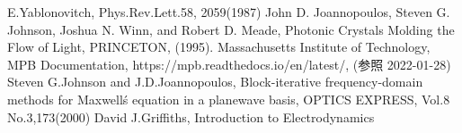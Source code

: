 \documentclass[a4paper,11pt,dvipdfmx]{jsreport}
\begin{document}
\tableofcontents







\begin{thebibliography}{2}
   E.Yablonovitch, Phys.Rev.Lett.58, 2059(1987)
   John D. Joannopoulos, Steven G. Johnson, Joshua N. Winn, and Robert D. Meade, Photonic Crystals Molding the Flow of Light, PRINCETON, (1995).
   Massachusetts Institute of Technology, MPB Documentation, https://mpb.readthedocs.io/en/latest/, (参照 2022-01-28)
   Steven G.Johnson and J.D.Joannopoulos, Block-iterative frequency-domain methods
  for Maxwell\'s equation in a planewave basis, OPTICS EXPRESS, Vol.8 No.3,173(2000)
   David J.Griffiths, Introduction to Electrodynamics
\end{thebibliography}
\end{document}
